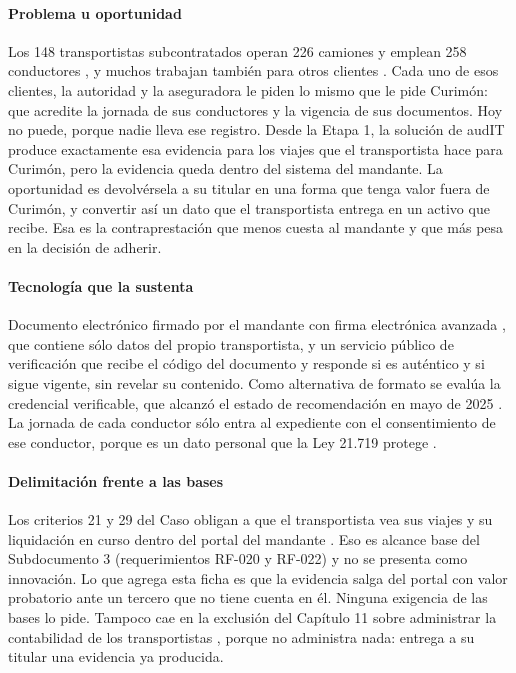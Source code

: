 \paragraph{Problema u oportunidad} Los 148 transportistas subcontratados operan 226 camiones y emplean
258 conductores , y muchos trabajan también para otros clientes
. Cada uno de esos clientes, la autoridad y la aseguradora le piden lo mismo que
le pide Curimón: que acredite la jornada de sus conductores y la vigencia de sus documentos. Hoy no
puede, porque nadie lleva ese registro. Desde la Etapa 1, la solución de audIT produce exactamente esa
evidencia para los viajes que el transportista hace para Curimón, pero la evidencia queda dentro del
sistema del mandante. La oportunidad es devolvérsela a su titular en una forma que tenga valor fuera
de Curimón, y convertir así un dato que el transportista entrega en un activo que recibe. Esa es la
contraprestación que menos cuesta al mandante y que más pesa en la decisión de adherir.

\paragraph{Tecnología que la sustenta} Documento electrónico firmado por el mandante con firma
electrónica avanzada \parencite{ley19799}, que contiene sólo datos del propio transportista, y un
servicio público de verificación que recibe el código del documento y responde si es auténtico y si
sigue vigente, sin revelar su contenido. Como alternativa de formato se evalúa la credencial
verificable, que alcanzó el estado de recomendación en mayo de 2025 \parencite{w3c_vcdm2}. La jornada
de cada conductor sólo entra al expediente con el consentimiento de ese conductor, porque es un dato
personal que la Ley 21.719 protege \parencite{ley21719}.

\paragraph{Delimitación frente a las bases} Los criterios 21 y 29 del Caso obligan a que el
transportista vea sus viajes y su liquidación en curso dentro del portal del mandante . Eso es alcance base del Subdocumento 3 (requerimientos RF-020 y RF-022) y no se presenta
como innovación. Lo que agrega esta ficha es que la evidencia salga del portal con valor probatorio ante
un tercero que no tiene cuenta en él. Ninguna exigencia de las bases lo pide. Tampoco cae en la
exclusión del Capítulo 11 sobre administrar la contabilidad de los transportistas , porque no administra nada: entrega a su titular una evidencia ya producida.


